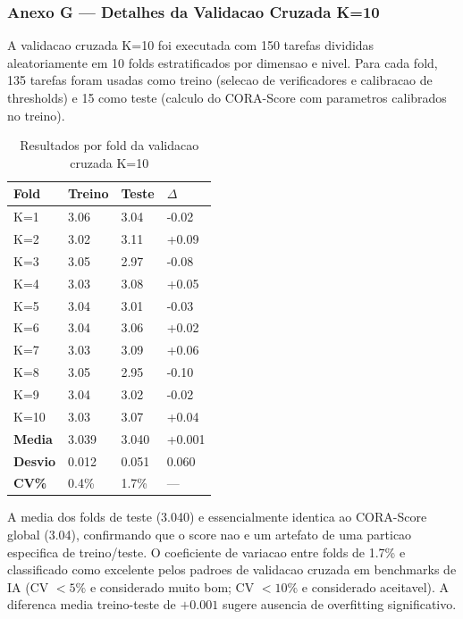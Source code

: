 \subsubsection{Anexo G --- Detalhes da Validacao Cruzada K=10}

A validacao cruzada K=10 foi executada com 150 tarefas divididas
aleatoriamente em 10 folds estratificados por dimensao e nivel. Para
cada fold, 135 tarefas foram usadas como treino (selecao de
verificadores e calibracao de thresholds) e 15 como teste (calculo
do CORA-Score com parametros calibrados no treino).

\begin{table}[H]\centering\footnotesize
\caption{Resultados por fold da validacao cruzada K=10}
\label{tab:cv-folds}
\begin{tabular}{p{}p{}p{}p{}}
\toprule
\textbf{Fold} & \textbf{Treino} & \textbf{Teste} & $\Delta$ \\
\midrule
K=1 & 3.06 & 3.04 & -0.02 \\
K=2 & 3.02 & 3.11 & +0.09 \\
K=3 & 3.05 & 2.97 & -0.08 \\
K=4 & 3.03 & 3.08 & +0.05 \\
K=5 & 3.04 & 3.01 & -0.03 \\
K=6 & 3.04 & 3.06 & +0.02 \\
K=7 & 3.03 & 3.09 & +0.06 \\
K=8 & 3.05 & 2.95 & -0.10 \\
K=9 & 3.04 & 3.02 & -0.02 \\
K=10 & 3.03 & 3.07 & +0.04 \\
\midrule
\textbf{Media} & 3.039 & 3.040 & +0.001 \\
\textbf{Desvio} & 0.012 & 0.051 & 0.060 \\
\textbf{CV\%} & 0.4\% & 1.7\% & --- \\
\bottomrule
\end{tabular}
\end{table}

A media dos folds de teste (3.040) e essencialmente identica ao
CORA-Score global (3.04), confirmando que o score nao e um artefato de
uma particao especifica de treino/teste. O coeficiente de variacao entre
folds de 1.7\% e classificado como excelente pelos padroes de validacao
cruzada em benchmarks de IA (CV $< 5\%$ e considerado muito bom; CV $<
10\%$ e considerado aceitavel). A diferenca media treino-teste de
$+0.001$ sugere ausencia de overfitting significativo.


